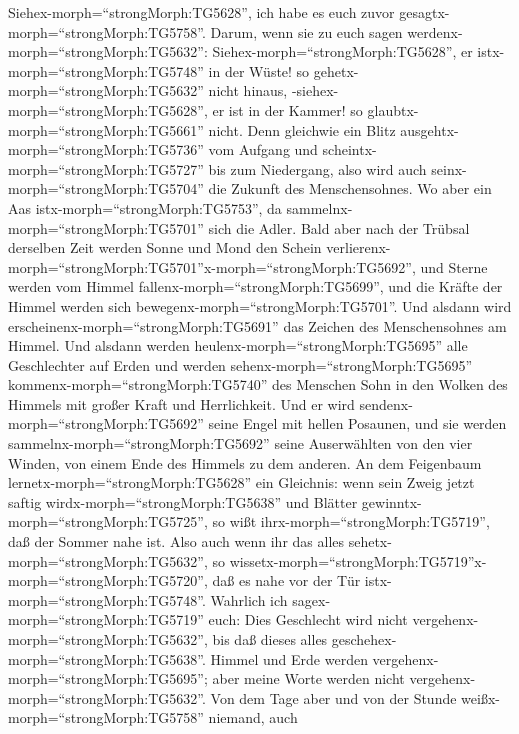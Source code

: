 Siehex-morph=``strongMorph:TG5628'', ich habe es euch zuvor
gesagtx-morph=``strongMorph:TG5758''.  Darum, wenn sie zu
euch sagen werdenx-morph=``strongMorph:TG5632'':
Siehex-morph=``strongMorph:TG5628'', er
istx-morph=``strongMorph:TG5748'' in der Wüste! so
gehetx-morph=``strongMorph:TG5632'' nicht hinaus,
-siehex-morph=``strongMorph:TG5628'', er ist in der Kammer! so
glaubtx-morph=``strongMorph:TG5661'' nicht.  Denn gleichwie
ein Blitz ausgehtx-morph=``strongMorph:TG5736'' vom Aufgang und
scheintx-morph=``strongMorph:TG5727'' bis zum Niedergang, also wird auch
seinx-morph=``strongMorph:TG5704'' die Zukunft des Menschensohnes.
 Wo aber ein Aas istx-morph=``strongMorph:TG5753'', da
sammelnx-morph=``strongMorph:TG5701'' sich die Adler.  Bald
aber nach der Trübsal derselben Zeit werden Sonne und Mond den Schein
verlierenx-morph=``strongMorph:TG5701''x-morph=``strongMorph:TG5692'',
und Sterne werden vom Himmel fallenx-morph=``strongMorph:TG5699'', und
die Kräfte der Himmel werden sich bewegenx-morph=``strongMorph:TG5701''.
 Und alsdann wird erscheinenx-morph=``strongMorph:TG5691''
das Zeichen des Menschensohnes am Himmel. Und alsdann werden
heulenx-morph=``strongMorph:TG5695'' alle Geschlechter auf Erden und
werden sehenx-morph=``strongMorph:TG5695''
kommenx-morph=``strongMorph:TG5740'' des Menschen Sohn in den Wolken des
Himmels mit großer Kraft und Herrlichkeit.  Und er wird
sendenx-morph=``strongMorph:TG5692'' seine Engel mit hellen Posaunen,
und sie werden sammelnx-morph=``strongMorph:TG5692'' seine Auserwählten
von den vier Winden, von einem Ende des Himmels zu dem anderen.
 An dem Feigenbaum lernetx-morph=``strongMorph:TG5628'' ein
Gleichnis: wenn sein Zweig jetzt saftig
wirdx-morph=``strongMorph:TG5638'' und Blätter
gewinntx-morph=``strongMorph:TG5725'', so wißt
ihrx-morph=``strongMorph:TG5719'', daß der Sommer nahe ist.
 Also auch wenn ihr das alles
sehetx-morph=``strongMorph:TG5632'', so
wissetx-morph=``strongMorph:TG5719''\textbar x-morph=``strongMorph:TG5720'',
daß es nahe vor der Tür istx-morph=``strongMorph:TG5748''. 
Wahrlich ich sagex-morph=``strongMorph:TG5719'' euch: Dies Geschlecht
wird nicht vergehenx-morph=``strongMorph:TG5632'', bis daß dieses alles
geschehex-morph=``strongMorph:TG5638''.  Himmel und Erde
werden vergehenx-morph=``strongMorph:TG5695''; aber meine Worte werden
nicht vergehenx-morph=``strongMorph:TG5632''.  Von dem Tage
aber und von der Stunde weißx-morph=``strongMorph:TG5758'' niemand, auch
